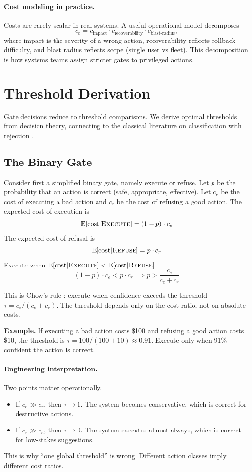 \paragraph{Cost modeling in practice.}
Costs are rarely scalar in real systems. A useful operational model decomposes
\[
c_e = c_{\text{impact}} \cdot c_{\text{recoverability}} \cdot c_{\text{blast-radius}},
\]
where impact is the severity of a wrong action, recoverability reflects rollback difficulty, and blast radius reflects scope (single user vs fleet). This decomposition is how systems teams assign stricter gates to privileged actions.

\section{Threshold Derivation}

Gate decisions reduce to threshold comparisons. We derive optimal thresholds from decision theory, connecting to the classical literature on classification with rejection \cite{chow1970optimum, cortes2016learning}.

\subsection{The Binary Gate}

Consider first a simplified binary gate, namely execute or refuse. Let $p$ be the probability that an action is correct (safe, appropriate, effective). Let $c_e$ be the cost of executing a bad action and $c_r$ be the cost of refusing a good action. The expected cost of execution is
\[
\mathbb{E}[\text{cost}|\textsc{Execute}] = (1-p) \cdot c_e
\]
The expected cost of refusal is
\[
\mathbb{E}[\text{cost}|\textsc{Refuse}] = p \cdot c_r
\]
Execute when $\mathbb{E}[\text{cost}|\textsc{Execute}] < \mathbb{E}[\text{cost}|\textsc{Refuse}]$
\[
(1-p) \cdot c_e < p \cdot c_r \implies p > \frac{c_e}{c_e + c_r}
\]

This is Chow's rule \cite{chow1970optimum}: execute when confidence exceeds the threshold $\tau = c_e/(c_e + c_r)$. The threshold depends only on the cost ratio, not on absolute costs.

\textbf{Example.} If executing a bad action costs \$100 and refusing a good action costs \$10, the threshold is $\tau = 100/(100+10) \approx 0.91$. Execute only when 91\% confident the action is correct.

\paragraph{Engineering interpretation.}
Two points matter operationally.
\begin{itemize}
\item If $c_e \gg c_r$, then $\tau \rightarrow 1$. The system becomes conservative, which is correct for destructive actions.
\item If $c_r \gg c_e$, then $\tau \rightarrow 0$. The system executes almost always, which is correct for low-stakes suggestions.
\end{itemize}
This is why ``one global threshold'' is wrong. Different action classes imply different cost ratios.

